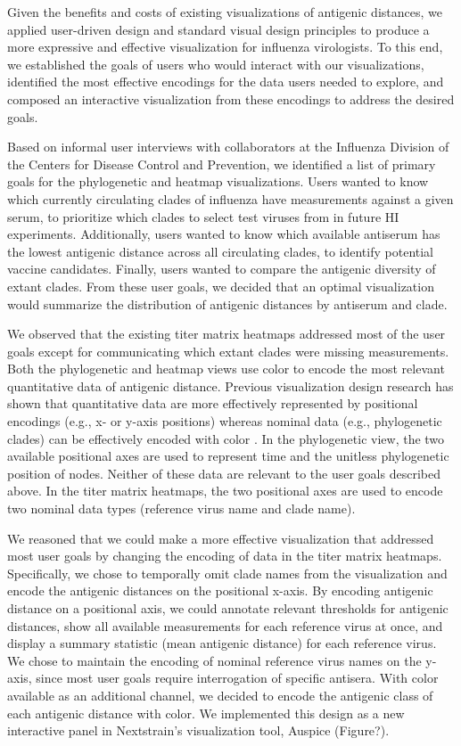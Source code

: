 \documentclass[utf8]{FrontiersinHarvard} %
\begin{document}
Given the benefits and costs of existing visualizations of antigenic distances, we applied user-driven design and standard visual design principles to produce a more expressive and effective visualization for influenza virologists.
To this end, we established the goals of users who would interact with our visualizations, identified the most effective encodings for the data users needed to explore, and composed an interactive visualization from these encodings to address the desired goals.

Based on informal user interviews with collaborators at the Influenza Division of the Centers for Disease Control and Prevention, we identified a list of primary goals for the phylogenetic and heatmap visualizations.
Users wanted to know which currently circulating clades of influenza have measurements against a given serum, to prioritize which clades to select test viruses from in future HI experiments.
Additionally, users wanted to know which available antiserum has the lowest antigenic distance across all circulating clades, to identify potential vaccine candidates.
Finally, users wanted to compare the antigenic diversity of extant clades.
From these user goals, we decided that an optimal visualization would summarize the distribution of antigenic distances by antiserum and clade.

We observed that the existing titer matrix heatmaps addressed most of the user goals except for communicating which extant clades were missing measurements.
Both the phylogenetic and heatmap views use color to encode the most relevant quantitative data of antigenic distance.
Previous visualization design research has shown that quantitative data are more effectively represented by positional encodings (e.g., x- or y-axis positions) whereas nominal data (e.g., phylogenetic clades) can be effectively encoded with color \citep{Mackinlay1986}.
In the phylogenetic view, the two available positional axes are used to represent time and the unitless phylogenetic position of nodes.
Neither of these data are relevant to the user goals described above.
In the titer matrix heatmaps, the two positional axes are used to encode two nominal data types (reference virus name and clade name).

We reasoned that we could make a more effective visualization that addressed most user goals by changing the encoding of data in the titer matrix heatmaps.
Specifically, we chose to temporally omit clade names from the visualization and encode the antigenic distances on the positional x-axis.
By encoding antigenic distance on a positional axis, we could annotate relevant thresholds for antigenic distances, show all available measurements for each reference virus at once, and display a summary statistic (mean antigenic distance) for each reference virus.
We chose to maintain the encoding of nominal reference virus names on the y-axis, since most user goals require interrogation of specific antisera.
With color available as an additional channel, we decided to encode the antigenic class of each antigenic distance with color.
We implemented this design as a new interactive panel in Nextstrain's visualization tool, Auspice (Figure?).
\end{document}
